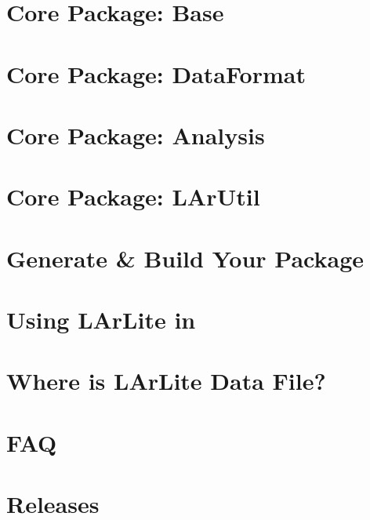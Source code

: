 \documentclass[a4paper,12pt]{report}
\begin{document}
\chapter{Core Package: Base}
\label{chap:base}


\chapter{Core Package: DataFormat}
\label{chap:dataformat}


\chapter{Core Package: Analysis}
\label{chap:analysis}


\chapter{Core Package: LArUtil}
\label{chap:larutil}


\chapter{Generate \& Build Your Package}
\label{chap:generate}


\chapter{Using LArLite in \python}
\label{chap:pyroot}


\chapter{Where is LArLite Data File?}
\label{chap:datafile}


\chapter{FAQ}
\label{chap:faq}


\chapter{Releases}
\label{chap:releases}


%
%




\end{document}
